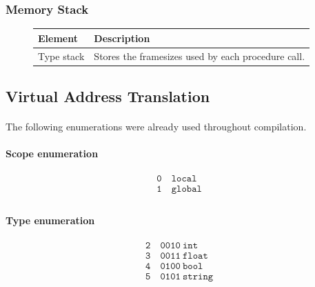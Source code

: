 \subsubsection{Memory Stack}

\begin{figure}[h]
    \centering
    \begin{tabular}{p{1in}p{3in}}
        \toprule
        \textbf{Element} & \textbf{Description}\\
        \midrule Type stack &
        Stores the framesizes used by each procedure call.\\
        
        \bottomrule
    \end{tabular}
\end{figure}

\newpage

\subsection{Virtual Address Translation}

\paragraph{} The following enumerations were already used throughout
compilation.

\paragraph{Scope enumeration}

\begin{align*}
    \texttt{0} &\ \texttt{local}\\
    \texttt{1} &\ \texttt{global}\\
\end{align*}

\paragraph{Type enumeration}

\begin{align*}
    \texttt{2} &\ \texttt{0010}\ \texttt{int}\\
    \texttt{3} &\ \texttt{0011}\ \texttt{float}\\
    \texttt{4} &\ \texttt{0100}\ \texttt{bool}\\
    \texttt{5} &\ \texttt{0101}\ \texttt{string}\\
\end{align*}

